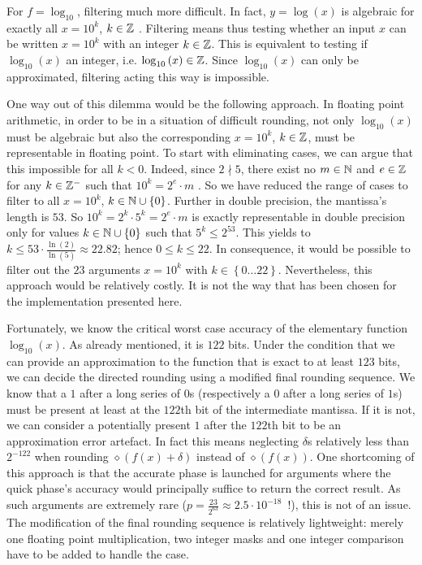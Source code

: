 For $f = \log_{10}$, filtering much more difficult. In fact, $y =
\log\left( x \right)$ is algebraic for exactly all $x = 10^k$, $k \in
\mathbb {Z}$ \cite{Baker75}. Filtering means thus testing whether an input $x$
can be written $x = 10^k$ with an integer $k \in \mathbb {Z}$. This is
equivalent to testing if $\log_{10}\left( x \right)$ an integer,
i.e. $\log_{10}\left( x \right) \in \mathbb {Z}$. Since $\log_{10}\left( x
\right)$ can only be approximated, filtering acting this way is
impossible.

One way out of this dilemma would be the following approach. In
floating point arithmetic, in order to be in a situation of difficult
rounding, not only $\log_{10}\left( x \right)$ must be algebraic but
also the corresponding $x = 10^k$, $k \in \mathbb {Z}$, must be representable
in floating point. To start with eliminating cases, we can argue that
this impossible for all $k < 0$. Indeed, since $2 \nmid 5$, there
exist no $m \in \mathbb {N}$ and $e \in \mathbb {Z}$ for any $k \in \mathbb {Z}^-$ such that
$10^k = 2^e \cdot m$ \cite{Muller97}. So we have reduced the range of
cases to filter to all $x = 10^k$, $k \in \mathbb {N} \cup \left \lbrace
0\right \rbrace$. Further in double precision, the mantissa's length
is $53$. So $10^k = 2^k \cdot 5^k = 2^e \cdot m$ is exactly
representable in double precision only for values $k \in \mathbb {N} \cup \left
\lbrace 0 \right \rbrace$ such that $5^k \leq 2^{53}$. This yields to
$k \leq 53 \cdot \frac{\ln\left( 2 \right)}{\ln\left( 5 \right)}
\approx 22.82$; hence $0 \leq k \leq 22$. In consequence, it would be
possible to filter out the $23$ arguments $x = 10^k$ with $k \in \left
\lbrace 0 \dots 22 \right \rbrace$. Nevertheless, this approach would
be relatively costly. It is not the way that has been chosen for the
implementation presented here.

Fortunately, we know the critical worst case accuracy of the
elementary function $\log_{10}\left( x \right)$. As already mentioned,
it is $122$ bits. Under the condition that we can provide an
approximation to the function that is exact to at least $123$ bits, we
can decide the directed rounding using a modified final rounding
sequence. We know that a $1$ after a long series of $0$s (respectively
a $0$ after a long series of $1$s) must be present at least at the
$122$th bit of the intermediate mantissa.  If it is not, we can
consider a potentially present $1$ after the $122$th bit to be an
approximation error artefact. In fact this means neglecting $\delta$s
relatively less than $2^{-122}$ when rounding $\diamond \left( f\left(
x \right) + \delta \right)$ instead of $\diamond \left( f\left( x
\right) \right)$. One shortcoming of this approach is that the
accurate phase is launched for arguments where the quick phase's
accuracy would principally suffice to return the correct result. As
such arguments are extremely rare ($p = \frac{23}{2^{63}} \approx 2.5
\cdot 10^{-18}$~!), this is not of an issue. The modification of the
final rounding sequence is relatively lightweight: merely one floating
point multiplication, two integer masks and one integer comparison
have to be added to handle the case.

